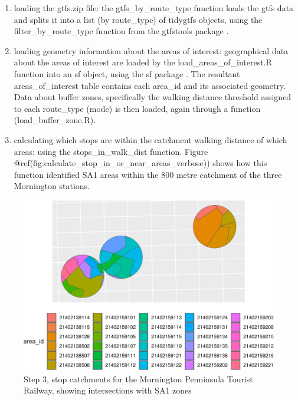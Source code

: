 \documentclass[preprint, 3p,
authoryear]{elsarticle} %
\begin{document}
\begin{enumerate}
\def\labelenumi{(\arabic{enumi})}
\item
  loading the gtfs.zip file: the gtfs\_by\_route\_type function loads
  the gtfs data and splits it into a list (by route\_type) of tidygtfs
  objects, using the filter\_by\_route\_type function from the gtfstools
  package \citep{filter_GTFS_by_mode}.
\item
  loading geometry information about the areas of interest: geographical
  data about the areas of interest are loaded by the
  load\_areas\_of\_interest.R function into an sf object, using the sf
  package \citep{R-sf}. The resultant areas\_of\_interest table contains
  each area\_id and its associated geometry. Data about buffer zones,
  specifically the walking distance threshold assigned to each
  route\_type (mode) is then loaded, again through a function
  (load\_buffer\_zone.R).
\item
  calculating which stops are within the catchment walking distance of
  which areas: using the stops\_in\_walk\_dist function. Figure
  @ref(fig:calculate\_stop\_in\_or\_near\_areas\_verbose)) shows how
  this function identified SA1 areas within the 800 metre catchment of
  the three Mornington stations.
\end{enumerate}

\begin{figure}
\includegraphics[width=1\linewidth]{Leveraging_GTFS_to_assess_transit_supply_Transport_Geography_files/figure-latex/calculate_stop_in_or_near_areas_verbose-1} \caption{Step 3, stop catchments for the Mornington Penninsula Tourist Railway, showing intersections with SA1 zones}\label{fig:calculate_stop_in_or_near_areas_verbose}
\end{figure}
\end{document}

